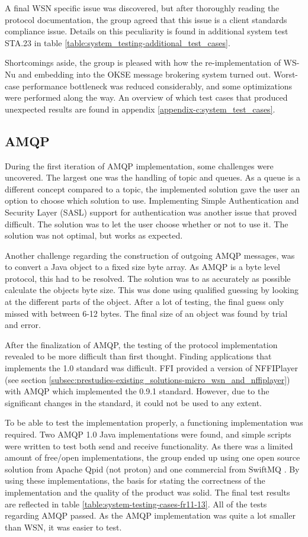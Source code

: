 A final WSN specific issue was discovered, but after thoroughly reading the protocol documentation, the group agreed that this issue is a client standards compliance issue. Details on this peculiarity is found in additional system test STA.23 in table \ref{table:system_testing-additional_test_cases}.

Shortcomings aside, the group is pleased with how the re-implementation of WS-Nu and embedding into the OKSE message brokering system turned out. Worst-case performance bottleneck was reduced considerably, and some optimizations were performed along the way.
An overview of which test cases that produced unexpected results are found in appendix \ref{appendix-c:system_test_cases}.

\subsection{AMQP}
\label{subsec:Implementation_AMQP}

During the first iteration of AMQP implementation, some challenges were uncovered. The largest one was the handling of topic and queues. As a queue is a different concept compared to a topic, the implemented solution gave the user an option to choose which solution to use. Implementing Simple Authentication and Security Layer (SASL) support for authentication was another issue that proved difficult. The solution was to let the user choose whether or not to use it. The solution was not optimal, but works as expected.

Another challenge regarding the construction of outgoing AMQP messages, was to convert a Java object to a fixed size byte array. As AMQP is a byte level protocol, this had to be resolved. The solution was to as accurately as possible calculate the objects byte size. This was done using qualified guessing by looking at the different parts of the object. After a lot of testing, the final guess only missed with between 6-12 bytes. The final size of an object was found by trial and error. 

After the finalization of AMQP, the testing of the protocol implementation revealed to be more difficult than first thought. Finding applications that implements the 1.0 standard was difficult. FFI provided a version of NFFIPlayer (see section \ref{subsec:prestudies-existing_solutions-micro_wsn_and_nffiplayer}) with AMQP which implemented the 0.9.1 standard. However, due to the significant changes in the standard, it could not be used to any extent.

To be able to test the implementation properly, a functioning implementation was required. Two AMQP 1.0 Java implementations were found, and simple scripts were written to test both send and receive functionality. As there was a limited amount of free/open implementations, the group ended up using one open source solution from Apache Qpid (not proton) \cite{apache-qpid} and one commercial from SwiftMQ \cite{swift-mq}. By using these implementations, the basis for stating the correctness of the implementation and the quality of the product was solid. The final test results are reflected in table \ref{table:system-testing-cases-fr11-13}. All of the tests regarding AMQP passed. As the AMQP implementation was quite a lot smaller than WSN, it was easier to test.
